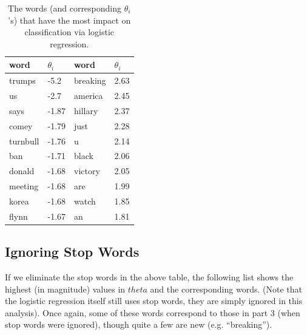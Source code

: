 \documentclass{article}
\renewcommand{\arraystretch}{1.25}
\begin{document}
   \begin{table}[h]
      \centering
      \renewcommand{\arraystretch}{1.5}

      \begin{tabular}{ p{7em}|l || p{7em}|l }
         \hline
         word     &     $\theta_i$   & word & $\theta_i$   \\
         \hline \hline
         trumps      &     -5.2        &  breaking    & 2.63    \\
         us          &     -2.7        &  america     & 2.45    \\
         says        &     -1.87       &  hillary     & 2.37    \\
         comey       &     -1.79       &  just        & 2.28    \\
         turnbull    &     -1.76       &  u           & 2.14    \\
         ban         &     -1.71       &  black       & 2.06    \\
         donald      &     -1.68       &  victory     & 2.05    \\
         meeting     &     -1.68       &  are         & 1.99    \\
         korea       &     -1.68       &  watch       & 1.85    \\
         flynn       &     -1.67       &  an          & 1.81    \\
         \hline
      \end{tabular}

      \caption{ The words (and corresponding $\theta_i$'s) that have the most impact
               on classification via logistic regression.}
      \label{part6table}
   \end{table}


   \subsection{Ignoring Stop Words}
   If we eliminate the stop words in the above table, the following list shows the highest (in magnitude)
   values in $theta$ and the corresponding words. (Note that the logistic regression itself still uses stop
   words, they are simply ignored in this analysis). Once again, some of these words correspond to those
   in part 3 (when stop words were ignored), though quite a few are new (e.g. ``breaking'').
\end{document}
